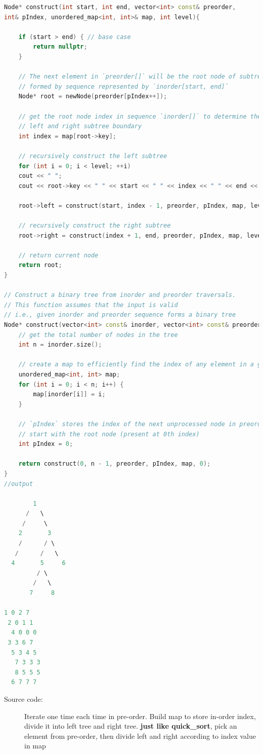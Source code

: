 \documentclass[a4paper,11pt,twoside]{book}
\begin{document}
\begin{lstlisting}[frame=single, language=c++]
Node* construct(int start, int end, vector<int> const& preorder,
int& pIndex, unordered_map<int, int>& map, int level){

	if (start > end) { // base case
		return nullptr;
	}
	
	// The next element in `preorder[]` will be the root node of subtree
	// formed by sequence represented by `inorder[start, end]`
	Node* root = newNode(preorder[pIndex++]);
	
	// get the root node index in sequence `inorder[]` to determine the
	// left and right subtree boundary
	int index = map[root->key];
	
	// recursively construct the left subtree
	for (int i = 0; i < level; ++i)
	cout << " ";
	cout << root->key << " " << start << " " << index << " " << end << endl;
	
	root->left = construct(start, index - 1, preorder, pIndex, map, level+1);
	
	// recursively construct the right subtree
	root->right = construct(index + 1, end, preorder, pIndex, map, level+1);
	
	// return current node
	return root;
}

// Construct a binary tree from inorder and preorder traversals.
// This function assumes that the input is valid
// i.e., given inorder and preorder sequence forms a binary tree
Node* construct(vector<int> const& inorder, vector<int> const& preorder){
	// get the total number of nodes in the tree
	int n = inorder.size();
	
	// create a map to efficiently find the index of any element in a given inorder sequence
	unordered_map<int, int> map;
	for (int i = 0; i < n; i++) {
		map[inorder[i]] = i;
	}
	
	// `pIndex` stores the index of the next unprocessed node in preorder;
	// start with the root node (present at 0th index)
	int pIndex = 0;
	
	return construct(0, n - 1, preorder, pIndex, map, 0);
}
//output 

        1
      /   \
     /     \
    2       3
    /      / \
   /      /   \
  4       5     6
         / \
        /   \
       7     8

1 0 2 7
 2 0 1 1
  4 0 0 0
 3 3 6 7
  5 3 4 5
   7 3 3 3
   8 5 5 5
  6 7 7 7
\end{lstlisting}
\begin{description}
	\item[Source code:] Iterate one time each time in pre-order.
	Build map to store in-order index, divide it into left tree and right tree. \textbf{just like quick\_sort}, pick an element from pre-order, then divide left and right according to index value in map
\end{description}
\end{document}

